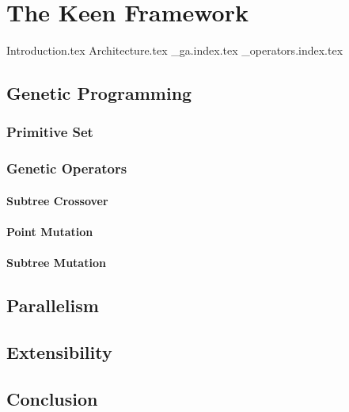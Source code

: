 \chapter{The Keen Framework}
\label{chap:keen}
  {Introduction.tex}
  {Architecture.tex}
  {_ga.index.tex}
  {_operators.index.tex}
  
  \section{Genetic Programming}
  \label{sec:genetic_programming}
    \subsection{Primitive Set}
    \label{sec:keen:gp:primitive_set}
      \Blindtext
    \subsection{Genetic Operators}
    \label{sec:keen:gp:operators}
      \subsubsection{Subtree Crossover}
      \label{sec:keen:gp:operators:crossover:subtree}
        \Blindtext
      \subsubsection{Point Mutation}
      \label{sec:keen:gp:operators:mutation:point}
        \Blindtext
      \subsubsection{Subtree Mutation}
      \label{sec:keen:op:mut:subtree}
        \Blindtext
  \section{Parallelism}
  \label{sec:parallelism}
    \Blindtext
  \section{Extensibility}
  \label{sec:extensibility}
    \Blindtext
  \section{Conclusion}
  \label{sec:conclusion}
    \Blindtext
